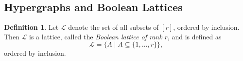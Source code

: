 \documentclass[11pt]{amsart}
\newcommand{\lcm}{\mathrm{lcm}}
\newcommand{\LC}{\mathcal{L}}
\theoremstyle{plain}
\numberwithin{lemma}{\DefaultNumberTheoremWithin}
\numberwithin{claim}{\DefaultNumberTheoremWithin}
\newtheorem{theorem}{Theorem}
\numberwithin{theorem}{\DefaultNumberTheoremWithin}
\numberwithin{corollary}{\DefaultNumberTheoremWithin}
\numberwithin{proposition}{\DefaultNumberTheoremWithin}
\numberwithin{conjecture}{\DefaultNumberTheoremWithin}
\theoremstyle{definition}
\newtheorem{definition}{Definition}
\numberwithin{definition}{\DefaultNumberTheoremWithin}
\theoremstyle{definition}
\numberwithin{question}{\DefaultNumberTheoremWithin}
\theoremstyle{definition}
\numberwithin{problem}{\DefaultNumberTheoremWithin}
\theoremstyle{remark}
\newtheorem{remark}{Remark}
\numberwithin{remark}
     {\DefaultNumberTheoremWithin}
\theoremstyle{remark}
\numberwithin{example}{\DefaultNumberTheoremWithin}
\begin{document}
%
\subsection{Hypergraphs and Boolean Lattices}
\begin{definition}\label{blndef}
    Let $\LC$ denote the set of all subsets of $[r]$, ordered by inclusion. Then $\LC$ is a lattice, called the \emph{Boolean lattice of rank $r$}, and is defined as
    \[\LC = \{ A \mid A \subseteq \{1,\ldots,r\} \},\]
    ordered by inclusion. 
\end{definition}
\end{document}
